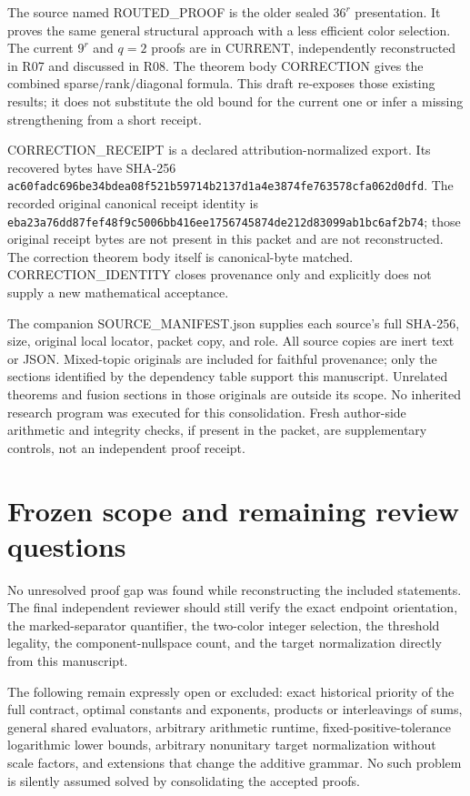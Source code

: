 \documentclass[
  11pt,
]{article}
\begin{document}
The source named ROUTED\_PROOF is the older sealed \(36^r\)
presentation. It proves the same general structural approach with a less
efficient color selection. The current \(9^r\) and \(q=2\) proofs are in
CURRENT, independently reconstructed in R07 and discussed in R08. The
theorem body CORRECTION gives the combined sparse/rank/diagonal formula.
This draft re-exposes those existing results; it does not substitute the
old bound for the current one or infer a missing strengthening from a
short receipt.

CORRECTION\_RECEIPT is a declared attribution-normalized export. Its
recovered bytes have SHA-256
\nolinkurl{ac60fadc696be34bdea08f521b59714b2137d1a4e3874fe763578cfa062d0dfd}.
The recorded original canonical receipt identity is
\nolinkurl{eba23a76dd87fef48f9c5006bb416ee1756745874de212d83099ab1bc6af2b74};
those original receipt bytes are not present in this packet and are not
reconstructed. The correction theorem body itself is canonical-byte
matched. CORRECTION\_IDENTITY closes provenance only and explicitly does
not supply a new mathematical acceptance.

The companion SOURCE\_MANIFEST.json supplies each source's full SHA-256,
size, original local locator, packet copy, and role. All source copies
are inert text or JSON. Mixed-topic originals are included for faithful
provenance; only the sections identified by the dependency table support
this manuscript. Unrelated theorems and fusion sections in those
originals are outside its scope. No inherited research program was
executed for this consolidation. Fresh author-side arithmetic and
integrity checks, if present in the packet, are supplementary controls,
not an independent proof receipt.

\section{Frozen scope and remaining review
questions}\label{frozen-scope-and-remaining-review-questions}

No unresolved proof gap was found while reconstructing the included
statements. The final independent reviewer should still verify the exact
endpoint orientation, the marked-separator quantifier, the two-color
integer selection, the threshold legality, the component-nullspace
count, and the target normalization directly from this manuscript.

The following remain expressly open or excluded: exact historical
priority of the full contract, optimal constants and exponents, products
or interleavings of sums, general shared evaluators, arbitrary
arithmetic runtime, fixed-positive-tolerance logarithmic lower bounds,
arbitrary nonunitary target normalization without scale factors, and
extensions that change the additive grammar. No such problem is silently
assumed solved by consolidating the accepted proofs.
\end{document}
